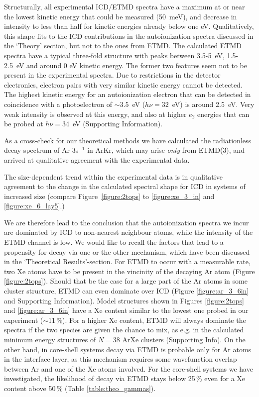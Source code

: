 Structurally, all experimental ICD/ETMD spectra have a maximum at or near the lowest kinetic energy that could be measured (50~meV), and decrease in intensity to less than half for kinetic energies already below one eV. 
Qualitatively, this shape fits to the ICD contributions in the autoionization spectra discussed in the `Theory' section, but not to the ones from ETMD. 
The calculated ETMD spectra have a typical three-fold structure with peaks between 3.5-5~eV, 1.5-2.5~eV and around 0 eV kinetic energy. 
The former two features seem not to be present in the experimental spectra. 
Due to restrictions in the detector electronics, electron pairs with very similar kinetic energy cannot be detected. 
The highest kinetic energy for an autoionization electron that can be detected in coincidence with a photoelectron of $\sim3.5$~eV ($h\nu = 32$~eV) is around 2.5~eV.
Very weak intensity is observed at this energy, and also at higher $e_2$ energies that can be probed at $h\nu = 34$~eV (Supporting Information).

As a cross-check for our theoretical methods we have calculated the radiationless decay spectrum of Ar 3s$^{-1}$ in ArKr, which may arise {\it only} from ETMD(3),\cite{foerstel} and arrived at qualitative agreement with the experimental data.\cite{arkr}

The size-dependent trend within the experimental data is in qualitative agreement to the change in the calculated spectral shape for ICD in systems of increased size (compare Figure~\ref{figure:2tops} to \ref{figure:xe_3_in} and \ref{figure:xe_6_lay5}.)

We are therefore lead to the conclusion that the autoionization spectra we incur are dominated by ICD to non-nearest neighbour atoms, while the intensity of the ETMD channel is low. 
We would like to recall the factors that lead to a propensity for decay via one or the other mechanism, which have been discussed in the `Theoretical Results'-section.
For ETMD to occur with a measurable rate, two Xe atoms have to be present in the vincinity of the decaying Ar atom (Figure \ref{figure:2tops}).
Should that be the case for a large part of the Ar atoms in some cluster structure, ETMD can even dominate over ICD (Figure \ref{figure:ar_3_6in} and Supporting Information).
Model structures shown in Figures \ref{figure:2tops} and \ref{figure:ar_3_6in} have a Xe content similar to the lowest one probed in our experiment ($\sim$11\,\%).
For a higher Xe content, ETMD will always dominate the spectra if the two species are given the chance to mix, as e.g. in the calculated minimum energy structures of $N=38$ ArXe clusters (Supporting Info).
On the other hand, in core-shell systems decay via ETMD is probable only for Ar atoms in the interface layer, as this mechanism requires some wavefunction overlap between Ar and one of the Xe atoms involved.
For the core-shell systems we have investigated, the likelihood of decay via ETMD stays below 25\,\% even for a Xe content above 50\,\% (Table \ref{table:theo_gammas}).

